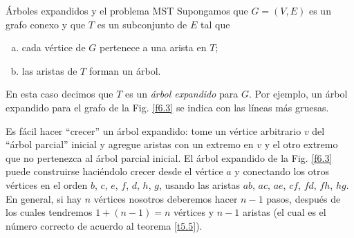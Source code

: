 \begin{section}{Árboles expandidos y el problema MST} \label{6.2}
Supongamos que $G=(V,E)$ es un grafo conexo y que $T$ es un
subconjunto de $E$ tal que
\begin{enumerate}[a)]
\item cada vértice de $G$ pertenece a una arista en $T$;
\item las aristas de $T$ forman un árbol.
\end{enumerate}
En esta caso decimos que $T$ es un {\em árbol expandido} para
 $G$. Por ejemplo, un árbol expandido para
el grafo de la Fig. \ref{f6.3} se indica con las líneas más
gruesas.
%


Es fácil hacer ``crecer'' un árbol expandido: tome un vértice
arbitrario $v$ del ``árbol parcial'' inicial y agregue aristas con
un extremo en $v$ y el otro extremo que no pertenezca al árbol
parcial inicial. El árbol expandido de la Fig. \ref{f6.3} puede
construirse haciéndolo crecer desde el vértice $a$ y conectando
los otros vértices en el orden $b$, $c$, $e$, $f$, $d$, $h$, $g$,
usando las aristas $ab$, $ac$, $ae$, $cf$, $fd$, $fh$, $hg$. En
general, si hay $n$ vértices nosotros deberemos hacer $n-1$ pasos,
después de los cuales tendremos $1+(n-1)=n$ vértices y $n-1$
aristas (el cual es el número correcto de acuerdo al teorema
\ref{t5.5}).



\end{section}
